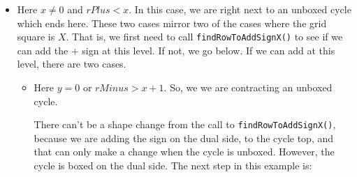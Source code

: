 \documentclass[12pt]{article}
\numberwithin{equation}{section}
\newcommand{\horizontalDominoMaybe}[3]{\filldraw [dominoMaybeStyle] (#2 - 1 + \eps, #1 - 1 + \eps) rectangle + (2 - \teps, 1 -\teps) node [dominoText] {$#3$};}
\newcommand{\verticalDominoMaybeShift}[4]{\filldraw [dominoMaybeStyle] (#2 - 1 + #4 + \eps,  #1 - 1 + \eps) rectangle + (1 - \teps,2 -\teps) node [dominoText] {$#3$};}
\begin{document}
  \begin{itemize}
    \item Here $x \neq 0$ and $rPlus < x$.
    In this case, we are right next to an unboxed cycle which ends here.
    These two cases mirror two of the cases where the grid square is $X$.
    That is, we first need to call \texttt{findRowToAddSignX()} to see if we can add the + sign at this level.
    If not, we go below.
    If we can add at this level, there are two cases.
    \begin{itemize}
      \item Here $y = 0$ or $rMinus > x + 1$.
      So, we we are contracting an unboxed cycle.
      \begin{figure}[H]
        \centering
      \end{figure}
      There can't be a shape change from the call to \texttt{findRowToAddSignX()}, because we are adding the sign on the dual side, to the cycle top, and that can only make a change when the cycle is unboxed.
      However, the cycle is boxed on the dual side.
      The next step in this example is:
      \begin{figure}[H]
        \centering
\end{figure}
\end{itemize}
\end{itemize}
\end{document}
